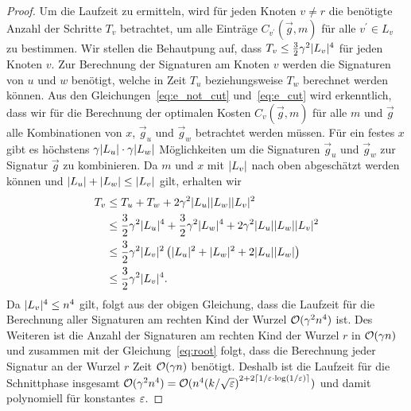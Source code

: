 \begin{proof}
    Um die Laufzeit zu ermitteln, wird für jeden Knoten $v \neq r$ die benötigte Anzahl der Schritte $T_v$ betrachtet, um alle Einträge $C_{v^\prime}(\vec{g}, m)$ für alle $v^\prime \in L_v$ zu bestimmen. 
    Wir stellen die Behautpung auf, dass $T_v \leq \frac{3}{2} \gamma^2 \lvert L_v\rvert^4$ für jeden Knoten $v$.
    Zur Berechnung der Signaturen am Knoten $v$ werden die Signaturen von $u$ und $w$ benötigt, welche in Zeit $T_u$ beziehungsweise $T_w$ berechnet werden können.
    Aus den Gleichungen~\eqref{eq:e_not_cut} und~\eqref{eq:e_cut} wird erkenntlich, dass wir für die Berechnung der optimalen Kosten $C_v(\vec{g}, m)$ für alle $m$ und $\vec{g}$ alle Kombinationen von $x$, $\vec{g}_u$ und $\vec{g}_w$ betrachtet werden müssen.
    Für ein festes $x$ gibt es höchstens $\gamma \lvert L_u\rvert \cdot \gamma \lvert L_w\rvert$ Möglichkeiten um die Signaturen $\vec{g}_u$ und $\vec{g}_w$ zur Signatur $\vec{g}$ zu kombinieren.
    Da $m$ und $x$ mit $\lvert L_v\rvert$ nach oben abgeschätzt werden können und $\lvert L_u\rvert + \lvert L_w\rvert \leq \lvert L_v\rvert$ gilt, erhalten wir
    \begin{equation*}
        \begin{aligned}
            T_v & \leq T_u + T_w + 2\gamma^2 \lvert L_u\rvert \lvert L_w\rvert \lvert L_v\rvert^2 \\
                & \leq \frac{3}{2} \gamma^2 \lvert L_u\rvert^4 + \frac{3}{2} \gamma^2 \lvert L_w\rvert^4 + 2\gamma^2 \lvert L_u\rvert \lvert L_w\rvert \lvert L_v\rvert^2 \\
                & \leq \frac{3}{2} \gamma^2 \lvert L_v\rvert^2 \left(\lvert L_u\rvert^2 + \lvert L_w\rvert^2 + 2 \lvert L_u\rvert \lvert L_w\rvert \right) \\
                & \leq \frac{3}{2} \gamma^2 \lvert L_v\rvert^4.
        \end{aligned}
    \end{equation*}
    Da $\lvert L_v\rvert^4 \leq n^4$ gilt, folgt aus der obigen Gleichung, dass die Laufzeit für die Berechnung aller Signaturen am rechten Kind der Wurzel $\mathcal{O}(\gamma^2 n^4)$ ist.
    Des Weiteren ist die Anzahl der Signaturen am rechten Kind der Wurzel $r$ in $\mathcal{O}(\gamma n)$ und zusammen mit der Gleichung~\eqref{eq:root} folgt, dass die Berechnung jeder Signatur an der Wurzel $r$ Zeit $\mathcal{O}(\gamma n)$ benötigt.
    Deshalb ist die Laufzeit für die Schnittphase insgesamt $\mathcal{O}(\gamma^2 n^4) = \mathcal{O}(n^4{(k/\sqrt{\varepsilon})}^{2+2 \lceil1/\varepsilon \cdot \log(1/\varepsilon)\rceil})$ und damit polynomiell für konstantes $\varepsilon$.
\end{proof}

